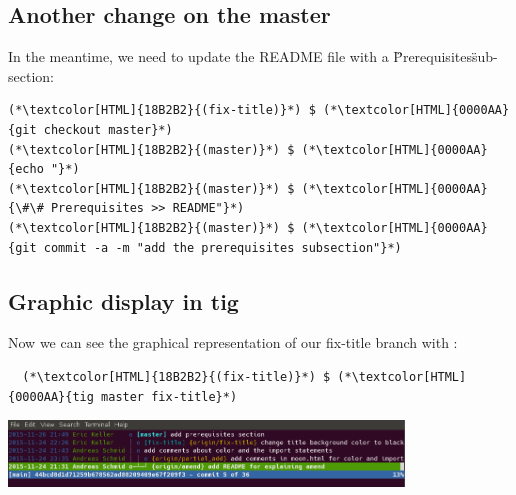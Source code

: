 \subsection{Another change on the master}
\begin{frame}[fragile]
  \subslidetitle

  In the meantime, we need to update the README file with a \"Prerequisites\" sub-section:
  \begin{lstlisting}
(*\textcolor[HTML]{18B2B2}{(fix-title)}*) $ (*\textcolor[HTML]{0000AA}{git checkout master}*)
(*\textcolor[HTML]{18B2B2}{(master)}*) $ (*\textcolor[HTML]{0000AA}{echo "}*)
(*\textcolor[HTML]{18B2B2}{(master)}*) $ (*\textcolor[HTML]{0000AA}{\#\# Prerequisites >> README"}*)
(*\textcolor[HTML]{18B2B2}{(master)}*) $ (*\textcolor[HTML]{0000AA}{git commit -a -m "add the prerequisites subsection"}*)
\end{lstlisting}

\end{frame}


\subsection{Graphic display in tig}
\begin{frame}[fragile]
  \subslidetitle

  Now we can see the graphical representation of our fix-title branch with :
  \begin{lstlisting}
  (*\textcolor[HTML]{18B2B2}{(fix-title)}*) $ (*\textcolor[HTML]{0000AA}{tig master fix-title}*)
\end{lstlisting}

  \vspace{1em}

  \centerline{\includegraphics[width=10.5cm]{../screen/tig-fix-title.png}}

\end{frame}

